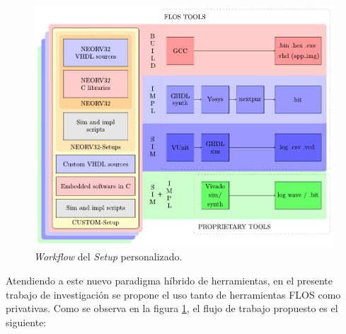 \begin{figure}[h!]
    \centering
    \includegraphics[width=14cm]{Figuras/workflow.pdf}
    \caption{\textit{Workflow} del \textit{Setup} personalizado.}
    \label{fig:workf}
\end{figure}

Atendiendo a este nuevo paradigma híbrido de herramientas, en el presente trabajo de investigación se propone el uso tanto de herramientas FLOS como privativas.
Como se observa en la figura \ref{fig:workf}, el flujo de trabajo propuesto es el siguiente:

